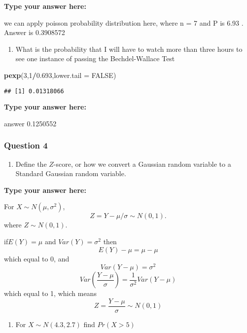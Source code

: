\documentclass[
]{article}
\newenvironment{Shaded}{\begin{snugshade}}{\end{snugshade}}
\newcommand{\DataTypeTok}[1]{\textcolor[rgb]{0.13,0.29,0.53}{#1}}
\newcommand{\DecValTok}[1]{\textcolor[rgb]{0.00,0.00,0.81}{#1}}
\newcommand{\FloatTok}[1]{\textcolor[rgb]{0.00,0.00,0.81}{#1}}
\newcommand{\KeywordTok}[1]{\textcolor[rgb]{0.13,0.29,0.53}{\textbf{#1}}}
\newcommand{\NormalTok}[1]{#1}
\newcommand{\OperatorTok}[1]{\textcolor[rgb]{0.81,0.36,0.00}{\textbf{#1}}}
\newcommand{\OtherTok}[1]{\textcolor[rgb]{0.56,0.35,0.01}{#1}}
\providecommand{\tightlist}{%
  \setlength{\itemsep}{0pt}\setlength{\parskip}{0pt}}
\begin{document}
\textbf{Type your answer here:}

we can apply poisson probability distribution here, where n = 7 and P is
6.93 . Answer is 0.3908572

\begin{enumerate}
\def\labelenumi{\alph{enumi}.}
\setcounter{enumi}{3}
\tightlist
\item
  What is the probability that I will have to watch more than three
  hours to see one instance of passing the Bechdel-Wallace Test
\end{enumerate}

\begin{Shaded}
\begin{Highlighting}[]
\KeywordTok{pexp}\NormalTok{(}\DecValTok{3}\NormalTok{,}\DecValTok{1}\OperatorTok{/}\FloatTok{0.693}\NormalTok{,}\DataTypeTok{lower.tail =} \OtherTok{FALSE}\NormalTok{)}
\end{Highlighting}
\end{Shaded}

\begin{verbatim}
## [1] 0.01318066
\end{verbatim}

\textbf{Type your answer here:}

answer 0.1250552

\hypertarget{question-4-1}{%
\subsubsection{Question 4}\label{question-4-1}}

\begin{enumerate}
\def\labelenumi{\alph{enumi}.}
\tightlist
\item
  Define the \(Z\)-score, or how we convert a Gaussian random variable
  to a Standard Gaussian random variable.
\end{enumerate}

\textbf{Type your answer here:}

For \(X\sim N(\mu,\sigma^2)\), \[
Z = Y−μ/σ∼N(0,1).
\] where \(Z\sim N(0,1)\).

if\(E(Y) = \mu\) and \(Var(Y) = σ^2\) then \[
E(Y) - \mu = \mu - \mu
\] which equal to 0, and \[
Var(Y - \mu) = σ^2
\] \[
Var(\frac{Y-\mu}{σ}) = \frac{1}{σ^2}Var(Y-\mu)
\] which equal to 1, which means \[
Z = \frac{Y-\mu}{σ}\sim N(0,1)
\]

\begin{enumerate}
\def\labelenumi{\alph{enumi}.}
\setcounter{enumi}{1}
\tightlist
\item
  For \(X\sim N(4.3,2.7)\) find \(Pr(X>5)\)
\end{enumerate}
\end{document}
